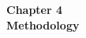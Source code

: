 \begin{center}

    \thispagestyle{empty}
    \vspace*{\fill}
    
    \Huge 
    \textbf{Chapter 4\\ Methodology}
       

    \vspace*{\fill}
\end{center}